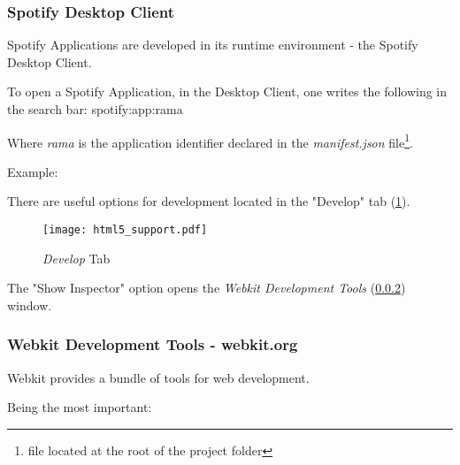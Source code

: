 
    \subsubsection{Spotify Desktop Client} %
    \label{ssub:subsection_name}
      Spotify Applications are developed in its runtime environment - the Spotify Desktop Client.

      To open a Spotify Application, in the Desktop Client, one writes the following in the search bar: spotify:app:rama

      Where \emph{rama} is the application identifier declared in the \emph{manifest.json} file\footnote{file located at the root of the project folder}.

      Example:

      

      There are useful options for development located in the "Develop" tab (\ref{fig:html5_support}).

      \begin{figure}[h]
        \begin{center}
          \texttt{[image: html5\_support.pdf]}
        \end{center}
        \caption{\emph{Develop} Tab}
        \label{fig:html5_support}
      \end{figure}

      The "Show Inspector" option opens the \emph{Webkit Development Tools} (\ref{ssub:webkit_tools}) window.

    \subsubsection{Webkit Development Tools - webkit.org} %
    \label{ssub:webkit_tools}

      Webkit provides a bundle of tools for web development.

      Being the most important:

